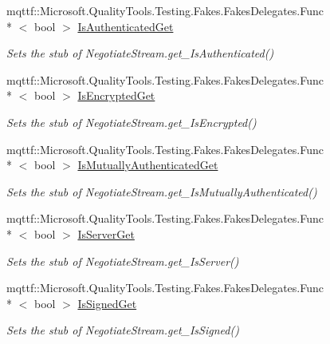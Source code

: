 \begin{DoxyCompactItemize}
mqttf\-::\-Microsoft.\-Quality\-Tools.\-Testing.\-Fakes.\-Fakes\-Delegates.\-Func\\*
$<$ bool $>$ \hyperlink{class_system_1_1_net_1_1_security_1_1_fakes_1_1_stub_negotiate_stream_a72ef3004ac2b358e3d5cc2b54fe32cd5}{Is\-Authenticated\-Get}
\begin{DoxyCompactList}\small\item\em Sets the stub of Negotiate\-Stream.\-get\-\_\-\-Is\-Authenticated()\end{DoxyCompactList}\item 
mqttf\-::\-Microsoft.\-Quality\-Tools.\-Testing.\-Fakes.\-Fakes\-Delegates.\-Func\\*
$<$ bool $>$ \hyperlink{class_system_1_1_net_1_1_security_1_1_fakes_1_1_stub_negotiate_stream_ad709e13bb317ad38e334b4fc46fcd56c}{Is\-Encrypted\-Get}
\begin{DoxyCompactList}\small\item\em Sets the stub of Negotiate\-Stream.\-get\-\_\-\-Is\-Encrypted()\end{DoxyCompactList}\item 
mqttf\-::\-Microsoft.\-Quality\-Tools.\-Testing.\-Fakes.\-Fakes\-Delegates.\-Func\\*
$<$ bool $>$ \hyperlink{class_system_1_1_net_1_1_security_1_1_fakes_1_1_stub_negotiate_stream_a008256f6713bc0c664d45bffd1d3a66c}{Is\-Mutually\-Authenticated\-Get}
\begin{DoxyCompactList}\small\item\em Sets the stub of Negotiate\-Stream.\-get\-\_\-\-Is\-Mutually\-Authenticated()\end{DoxyCompactList}\item 
mqttf\-::\-Microsoft.\-Quality\-Tools.\-Testing.\-Fakes.\-Fakes\-Delegates.\-Func\\*
$<$ bool $>$ \hyperlink{class_system_1_1_net_1_1_security_1_1_fakes_1_1_stub_negotiate_stream_a69f1ca37880bafb9c5b423ee4423922c}{Is\-Server\-Get}
\begin{DoxyCompactList}\small\item\em Sets the stub of Negotiate\-Stream.\-get\-\_\-\-Is\-Server()\end{DoxyCompactList}\item 
mqttf\-::\-Microsoft.\-Quality\-Tools.\-Testing.\-Fakes.\-Fakes\-Delegates.\-Func\\*
$<$ bool $>$ \hyperlink{class_system_1_1_net_1_1_security_1_1_fakes_1_1_stub_negotiate_stream_aaaa6f91a76d08fbe28c485acd75f8110}{Is\-Signed\-Get}
\begin{DoxyCompactList}\small\item\em Sets the stub of Negotiate\-Stream.\-get\-\_\-\-Is\-Signed()\end{DoxyCompactList}\item 

\end{DoxyCompactItemize}
